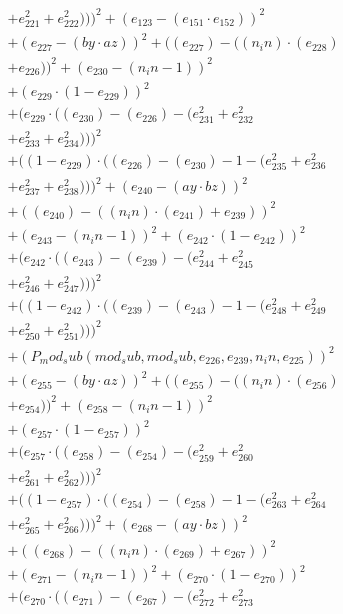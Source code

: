 \documentclass[10pt, a4paper]{article}
\begin{document}
\begin{small}
\begin{align*}
& + e_{221}^{2} + e_{222}^{2})))^{2} + (e_{123} - (e_{151}  \cdot  e_{152}))^{2} \\
& + (e_{227} - (by  \cdot  az))^{2} + ((e_{227}) - ((n_in)  \cdot  (e_{228}) \\
& + e_{226}))^{2} + (e_{230} - (n_in - 1))^{2} \\
& + (e_{229}  \cdot  (1 - e_{229}))^{2} \\
& + (e_{229}  \cdot  ((e_{230}) - (e_{226}) - (e_{231}^{2} + e_{232}^{2} \\
& + e_{233}^{2} + e_{234}^{2})))^{2} \\
& + ((1 - e_{229})  \cdot  ((e_{226}) - (e_{230}) - 1 - (e_{235}^{2} + e_{236}^{2} \\
& + e_{237}^{2} + e_{238}^{2})))^{2} + (e_{240} - (ay  \cdot  bz))^{2} \\
& + ((e_{240}) - ((n_in)  \cdot  (e_{241}) + e_{239}))^{2} \\
& + (e_{243} - (n_in - 1))^{2} + (e_{242}  \cdot  (1 - e_{242}))^{2} \\
& + (e_{242}  \cdot  ((e_{243}) - (e_{239}) - (e_{244}^{2} + e_{245}^{2} \\
& + e_{246}^{2} + e_{247}^{2})))^{2} \\
& + ((1 - e_{242})  \cdot  ((e_{239}) - (e_{243}) - 1 - (e_{248}^{2} + e_{249}^{2} \\
& + e_{250}^{2} + e_{251}^{2})))^{2} \\
& + (P_mod_sub(mod_sub, mod_sub, e_{226}, e_{239}, n_in, e_{225}))^{2} \\
& + (e_{255} - (by  \cdot  az))^{2} + ((e_{255}) - ((n_in)  \cdot  (e_{256}) \\
& + e_{254}))^{2} + (e_{258} - (n_in - 1))^{2} \\
& + (e_{257}  \cdot  (1 - e_{257}))^{2} \\
& + (e_{257}  \cdot  ((e_{258}) - (e_{254}) - (e_{259}^{2} + e_{260}^{2} \\
& + e_{261}^{2} + e_{262}^{2})))^{2} \\
& + ((1 - e_{257})  \cdot  ((e_{254}) - (e_{258}) - 1 - (e_{263}^{2} + e_{264}^{2} \\
& + e_{265}^{2} + e_{266}^{2})))^{2} + (e_{268} - (ay  \cdot  bz))^{2} \\
& + ((e_{268}) - ((n_in)  \cdot  (e_{269}) + e_{267}))^{2} \\
& + (e_{271} - (n_in - 1))^{2} + (e_{270}  \cdot  (1 - e_{270}))^{2} \\
& + (e_{270}  \cdot  ((e_{271}) - (e_{267}) - (e_{272}^{2} + e_{273}^{2} \\

\end{align*}
\end{small}
\end{document}
